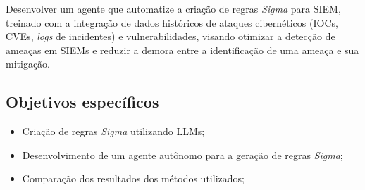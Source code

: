 Desenvolver um agente que automatize a criação de regras \textit{Sigma} para SIEM, treinado com a integração de dados históricos de ataques cibernéticos (IOCs, CVEs, \textit{logs} de incidentes) e vulnerabilidades, visando otimizar a detecção de ameaças em SIEMs e reduzir a demora entre a identificação de uma ameaça e sua mitigação.

\subsection{Objetivos específicos}\label{subsec:objetivosEspecificos}

\begin{itemize}
    \item Criação de regras \textit{Sigma} utilizando LLMs;
    \item Desenvolvimento de um agente autônomo para a geração de regras \textit{Sigma};
    \item Comparação dos resultados dos métodos utilizados;
\end{itemize}


 


